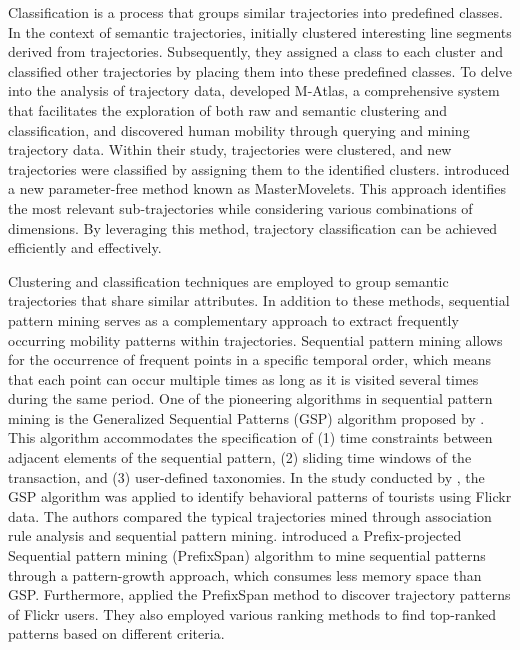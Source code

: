 \documentclass{article}
\begin{document}
Classification is a process that groups similar trajectories into predefined classes. In the context of semantic trajectories, \cite{lee_trajectory_2007} initially clustered interesting line segments derived from trajectories. Subsequently, they assigned a class to each cluster and classified other trajectories by placing them into these predefined classes. To delve into the analysis of trajectory data, \cite{giannotti_unveiling_2011} developed M-Atlas, a comprehensive system that facilitates the exploration of both raw and semantic clustering and classification, and discovered human mobility through querying and mining trajectory data. Within their study, trajectories were clustered, and new trajectories were classified by assigning them to the identified clusters. \cite{ferrero_mastermovelets_2020} introduced a new parameter-free method known as MasterMovelets. This approach identifies the most relevant sub-trajectories while considering various combinations of dimensions. By leveraging this method, trajectory classification can be achieved efficiently and effectively. 

Clustering and classification techniques are employed to group semantic trajectories that share similar attributes. In addition to these methods, sequential pattern mining serves as a complementary approach to extract frequently occurring mobility patterns within trajectories. Sequential pattern mining allows for the occurrence of frequent points in a specific temporal order, which means that each point can occur multiple times as long as it is visited several times during the same period. One of the pioneering algorithms in sequential pattern mining is the Generalized Sequential Patterns (GSP) algorithm proposed by \cite{srikant_mining_1996}. This algorithm accommodates the specification of (1) time constraints between adjacent elements of the sequential pattern, (2) sliding time windows of the transaction, and (3) user-defined taxonomies. In the study conducted by \cite{hopken_flickr_2020}, the GSP algorithm was applied to identify behavioral patterns of tourists using Flickr data. The authors compared the typical trajectories mined through association rule analysis and sequential pattern mining. \cite{pei_mining_2004} introduced a Prefix-projected Sequential pattern mining (PrefixSpan) algorithm to mine sequential patterns through a pattern-growth approach, which consumes less memory space than GSP. Furthermore, \cite{yin_diversified_2011} applied the PrefixSpan method to discover trajectory patterns of Flickr users. They also employed various ranking methods to find top-ranked patterns based on different criteria.
\end{document}
